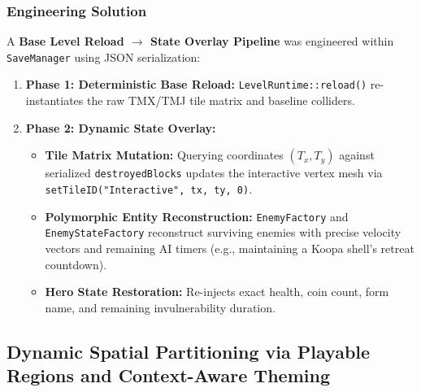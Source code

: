 \subsubsection{Engineering Solution}
A \textbf{Base Level Reload $\rightarrow$ State Overlay Pipeline} was engineered within \texttt{SaveManager} using JSON serialization:
\begin{enumerate}
    \item \textbf{Phase 1: Deterministic Base Reload:} \texttt{LevelRuntime::reload()} re-instantiates the raw TMX/TMJ tile matrix and baseline colliders.
    \item \textbf{Phase 2: Dynamic State Overlay:}
    \begin{itemize}
        \item \textbf{Tile Matrix Mutation:} Querying coordinates $(T_x, T_y)$ against serialized \texttt{destroyedBlocks} updates the interactive vertex mesh via \texttt{setTileID("Interactive", tx, ty, 0)}.
        \item \textbf{Polymorphic Entity Reconstruction:} \texttt{EnemyFactory} and \texttt{EnemyStateFactory} reconstruct surviving enemies with precise velocity vectors and remaining AI timers (e.g., maintaining a Koopa shell's retreat countdown).
        \item \textbf{Hero State Restoration:} Re-injects exact health, coin count, form name, and remaining invulnerability duration.
    \end{itemize}
\end{enumerate}

\subsection{Dynamic Spatial Partitioning via Playable Regions and Context-Aware Theming}
\label{subsec:playable_regions}
